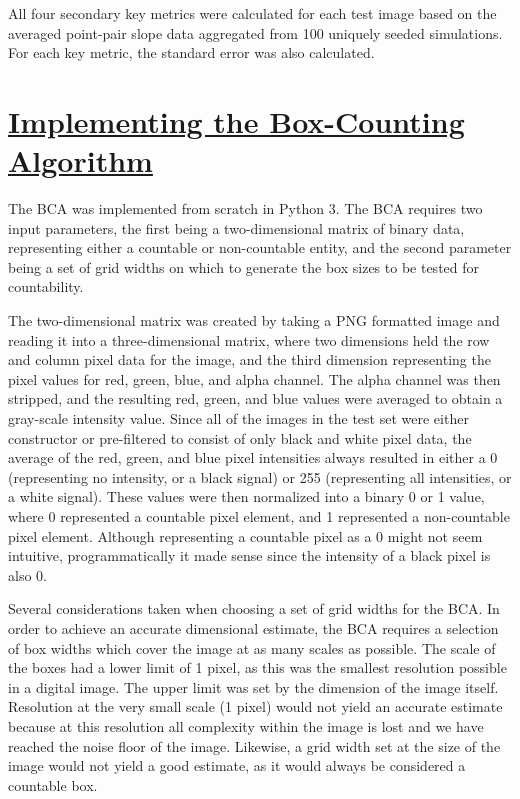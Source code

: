 \documentclass[12pt, oneside]{book}
\begin{document}
All four secondary key metrics were calculated for each test image based on the averaged point-pair slope data aggregated from 100 uniquely seeded simulations.  For each key metric, the standard error was also calculated.

% 
%
\section{\underline{Implementing the Box-Counting Algorithm}}
The BCA was implemented from scratch in Python 3.  The BCA requires two input parameters, the first being a two-dimensional matrix of binary data, representing either a countable or non-countable entity, and the second parameter being a set of grid widths on which to generate the box sizes to be tested for countability.  

The two-dimensional matrix was created by taking a PNG formatted image and reading it into a three-dimensional matrix, where two dimensions held the row and column pixel data for the image, and the third dimension representing the pixel values for red, green, blue, and alpha channel.  The alpha channel was then stripped, and the resulting red, green, and blue values were averaged to obtain a gray-scale intensity value.  Since all of the images in the test set were either constructor or pre-filtered to consist of only black and white pixel data, the average of the red, green, and blue pixel intensities always resulted in either a 0 (representing no intensity, or a black signal) or 255 (representing all intensities, or a white signal).  These values were then normalized into a binary 0 or 1 value, where 0 represented a countable pixel element, and 1 represented a non-countable pixel element.  Although representing a countable pixel as a 0 might not seem intuitive, programmatically it made sense since the intensity of a black pixel is also 0.

Several considerations taken when choosing a set of grid widths for the BCA.  In order to achieve an accurate dimensional estimate, the BCA requires a selection of box widths which cover the image at as many scales as possible.  The scale of the boxes had a lower limit of 1 pixel, as this was the smallest resolution possible in a digital image.  The upper limit was set by the dimension of the image itself.  Resolution at the very small scale (1 pixel) would not yield an accurate estimate because at this resolution all complexity within the image is lost and we have reached the noise floor of the image.  Likewise, a grid width set at the size of the image would not yield a good estimate, as it would always be considered a countable box.  
\end{document}
